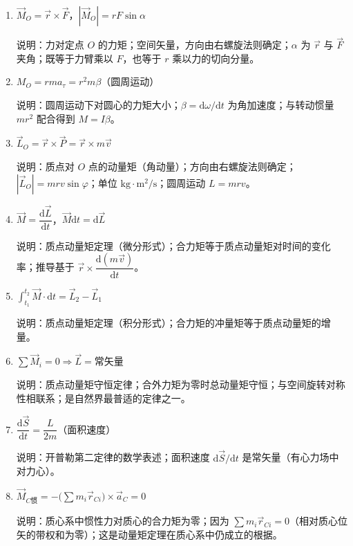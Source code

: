 \documentclass[12pt,a4paper]{ctexart}
\begin{document}
\begin{enumerate}[leftmargin=3em,label=\textbf{公式\arabic*}：,ref=公式\arabic*]

    \item $\vec{M}_O = \vec{r}\times\vec{F}$，$|\vec{M}_O| = rF\sin\alpha$

    说明：力对定点 $O$ 的力矩；空间矢量，方向由右螺旋法则确定；$\alpha$ 为 $\vec{r}$ 与 $\vec{F}$ 夹角；既等于力臂乘以 $F$，也等于 $r$ 乘以力的切向分量。

    \item $M_O = rma_\tau = r^2 m\beta$（圆周运动）

    说明：圆周运动下对圆心的力矩大小；$\beta = \mathrm{d}\omega/\mathrm{d}t$ 为角加速度；与转动惯量 $mr^2$ 配合得到 $M = I\beta$。

    \item $\vec{L}_O = \vec{r}\times\vec{P} = \vec{r}\times m\vec{v}$

    说明：质点对 $O$ 点的动量矩（角动量）；方向由右螺旋法则确定；$|\vec{L}_O| = mrv\sin\varphi$；单位 $\mathrm{kg\cdot m^2/s}$；圆周运动 $L = mrv$。

    \item $\vec{M} = \dfrac{\mathrm{d}\vec{L}}{\mathrm{d}t}$，$\vec{M}\mathrm{d}t = \mathrm{d}\vec{L}$

    说明：质点动量矩定理（微分形式）；合力矩等于质点动量矩对时间的变化率；推导基于 $\vec{r}\times\dfrac{\mathrm{d}(m\vec{v})}{\mathrm{d}t}$。

    \item $\displaystyle\int_{t_1}^{t_2}\vec{M}\cdot\mathrm{d}t = \vec{L}_2 - \vec{L}_1$

    说明：质点动量矩定理（积分形式）；合力矩的冲量矩等于质点动量矩的增量。

    \item $\sum \vec{M}_i = 0 \Rightarrow \vec{L} = \text{常矢量}$

    说明：质点动量矩守恒定律；合外力矩为零时总动量矩守恒；与空间旋转对称性相联系；是自然界最普适的定律之一。

    \item $\dfrac{\mathrm{d}\vec{S}}{\mathrm{d}t} = \dfrac{L}{2m}$（面积速度）

    说明：开普勒第二定律的数学表述；面积速度 $\mathrm{d}\vec{S}/\mathrm{d}t$ 是常矢量（有心力场中对力心）。

    \item $\vec{M}_{C\text{惯}} = -\biggl(\sum m_i\vec{r}_{Ci}\biggr)\times\vec{a}_C = 0$

    说明：质心系中惯性力对质心的合力矩为零；因为 $\sum m_i\vec{r}_{Ci} = 0$（相对质心位矢的带权和为零）；这是动量矩定理在质心系中仍成立的根据。


\end{enumerate}
\end{document}

